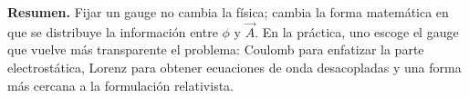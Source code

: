 \documentclass[../main.tex]{subfiles}
\begin{document}
\begin{cajaidea}
\textbf{Resumen.} Fijar un gauge no cambia la física; cambia la forma matemática en que se distribuye la información entre $\phi$ y $\vec A$. En la práctica, uno escoge el gauge que vuelve más transparente el problema: Coulomb para enfatizar la parte electrostática, Lorenz para obtener ecuaciones de onda desacopladas y una forma más cercana a la formulación relativista.
\end{cajaidea}
\end{document}
